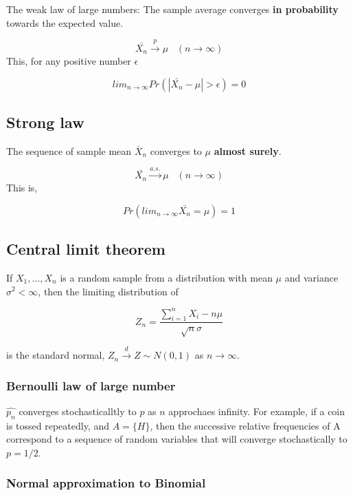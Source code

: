 \documentclass[]{book}
\begin{document}
The weak law of large numbers: The sample average converges \textbf{in probability} towards the expected value.

\[\bar{X_n} \xrightarrow{p} \mu \; \; \; (n \rightarrow \infty)\]
This, for any positive number \(\epsilon\)

\[lim_{n \rightarrow \infty} Pr(|\bar{X_n}-\mu|>\epsilon)=0\]

\hypertarget{strong-law}{%
\subsection{Strong law}\label{strong-law}}

The sequence of sample mean \(\bar{X}_n\) converges to \(\mu\) \textbf{almost surely}.

\[\bar{X_n} \xrightarrow{a.s.} \mu \; \; \; (n \rightarrow \infty)\]
This is,

\[Pr(lim_{n \rightarrow \infty} \bar{X_n}=\mu)=1\]

\hypertarget{central-limit-theorem}{%
\subsection{Central limit theorem}\label{central-limit-theorem}}

If \(X_1,...,X_n\) is a random sample from a distribution with mean \(\mu\) and variance \(\sigma^2 < \infty\), then the limiting distribution of

\[Z_n=\frac{\sum_{i=1}^n X_i - n\mu}{\sqrt{n} \sigma}\]

is the standard normal, \(Z_n \xrightarrow{d} Z \sim N(0,1)\) as \(n \rightarrow \infty\).

\hypertarget{bernoulli-law-of-large-number}{%
\subsubsection{Bernoulli law of large number}\label{bernoulli-law-of-large-number}}

\(\hat{p_n}\) converges stochasticalltly to \(p\) as \(n\) approchaes infinity. For example, if a coin is tossed repeatedly, and \(A=\{H\}\), then the successive relative frequencies of A correspond to a sequence of random variables that will converge stochastically to \(p=1/2\).

\hypertarget{normal-approximation-to-binomial}{%
\subsubsection{Normal approximation to Binomial}\label{normal-approximation-to-binomial}}
\end{document}
